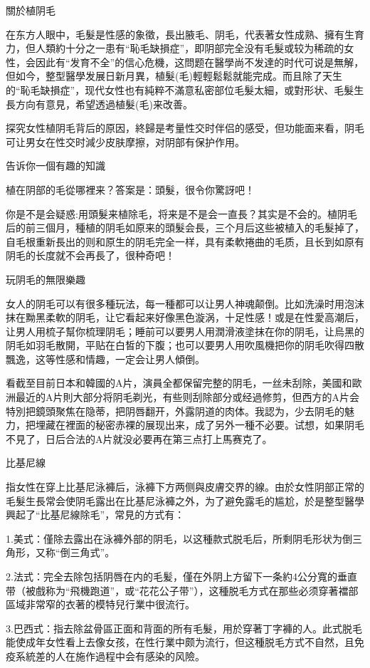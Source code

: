\documentclass[12pt,UTF8]{ctexbook}
\begin{document}
關於植阴毛

在东方人眼中，毛髮是性感的象徵，長出腋毛、阴毛，代表著女性成熟、擁有生育力，但人類約十分之一患有“恥毛缺損症”，即阴部完全没有毛髮或较为稀疏的女性，会因此有“发育不全”的信心危機，这問题在醫學尚不发達的时代可说是無解，但如今，整型醫學发展日新月異，植髮(毛)輕輕鬆鬆就能完成。而且除了天生的“恥毛缺損症”，现代女性也有純粹不滿意私密部位毛髮太細，或對形状、毛髮生長方向有意見，希望透過植髮(毛)来改善。

探究女性植阴毛背后的原因，終歸是考量性交时伴侣的感受，但功能面来看，阴毛可让男女在性交时減少皮肤摩擦，对阴部有保护作用。

告诉你一個有趣的知識

植在阴部的毛從哪裡来？答案是：頭髮，很令你驚訝吧！

你是不是会疑惑:用頭髮来植除毛，将来是不是会一直長？其实是不会的。植阴毛后的前三個月，種植的阴毛如原来的頭髮会長，三个月后这些被植入的毛髮掉了，自毛根重新長出的则和原生的阴毛完全一样，具有柔軟捲曲的毛质，且长到如原有阴毛的长度就不会再長了，很种奇吧！

玩阴毛的無限樂趣

女人的阴毛可以有很多種玩法，每一種都可以让男人神魂颠倒。比如洗澡时用泡沫抹在黝黑柔軟的阴毛，让它看起来好像黑色漩涡，十足性感！或是在性愛高潮后，让男人用梳子幫你梳理阴毛；睡前可以要男人用潤滑液塗抹在你的阴毛，让烏黑的阴毛如羽毛散開，平贴在白皙的下腹；也可以要男人用吹風機把你的阴毛吹得四散飄逸，这等性感和情趣，一定会让男人傾倒。

看截至目前日本和韓國的A片，演員全都保留完整的阴毛，一丝未刮除，美國和歐洲最近的A片則大部分将阴毛剃光，有些则刮除部分或经過修剪，但西方的A片会特別把鏡頭聚焦在隐蒂，把阴唇翻开，外露阴道的肉体。我認为，少去阴毛的魅力，把埋藏在裡面的秘密赤裸的展现出来，成了另外一種不必要。试想，如果阴毛不見了，日后合法的A片就没必要再在第三点打上馬赛克了。

比基尼線

指女性在穿上比基尼泳褲后，泳褲下方两侧與皮膚交界的線。由於女性阴部正常的毛髮生長常会使阴毛露出在比基尼泳褲之外，为了避免露毛的尴尬，於是整型醫學興起了“比基尼線除毛”，常見的方式有：

1.美式：僅除去露出在泳褲外部的阴毛，以这種款式脱毛后，所剩阴毛形状为倒三角形，又称“倒三角式”。

2.法式：完全去除包括阴唇在内的毛髪，僅在外阴上方留下一条約4公分寬的垂直带（被戲称为“飛機跑道”，或“花花公子带”），这種脱毛方式在那些必须穿著襠部區域非常窄的衣著的模特兒行業中很流行。

3.巴西式：指去除盆骨區正面和背面的所有毛髮，用於穿著丁字褲的人。此式脱毛能使成年女性看上去像女孩，在性行業中颇为流行，但这種脱毛方式不自然，且免疫系統差的人在施作過程中会有感染的风險。
\end{document}
